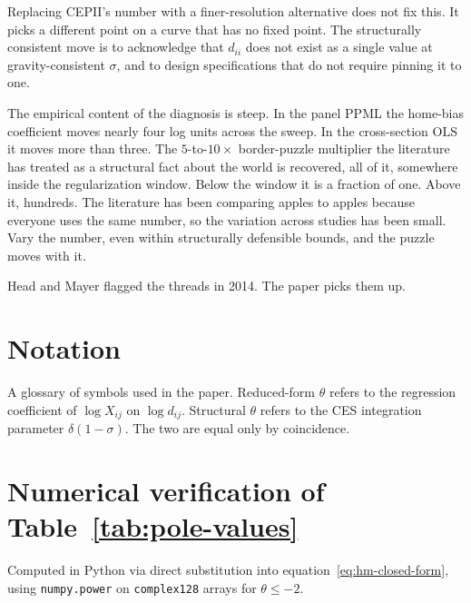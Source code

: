 \documentclass[11pt, letterpaper]{article}
\theoremstyle{definition}
\newcommand{\dii}{d_{ii}}
\begin{document}
Replacing CEPII's number with a finer-resolution alternative does not
fix this. It picks a different point on a curve that has no fixed
point. The structurally consistent move is to acknowledge that
$\dii$ does not exist as a single value at gravity-consistent
$\sigma$, and to design specifications that do not require pinning
it to one.

The empirical content of the diagnosis is steep. In the panel PPML
the home-bias coefficient moves nearly four log units across the
sweep. In the cross-section OLS it moves more than three. The
$5$-to-$10\times$ border-puzzle multiplier the literature has
treated as a structural fact about the world is recovered, all of
it, somewhere inside the regularization window. Below the window it
is a fraction of one. Above it, hundreds. The literature has been
comparing apples to apples because everyone uses the same number, so
the variation across studies has been small. Vary the number, even
within structurally defensible bounds, and the puzzle moves with it.

Head and Mayer flagged the threads in 2014. The paper picks them up.

\appendix

\section{Notation}
A glossary of symbols used in the paper. Reduced-form $\theta$ refers to
the regression coefficient of $\log X_{ij}$ on $\log d_{ij}$. Structural
$\theta$ refers to the CES integration parameter $\delta(1 - \sigma)$.
The two are equal only by coincidence.

\section{Numerical verification of Table~\ref{tab:pole-values}}
Computed in Python via direct substitution into
equation~\eqref{eq:hm-closed-form}, using \texttt{numpy.power} on
\texttt{complex128} arrays for $\theta \leq -2$.


\end{document}
